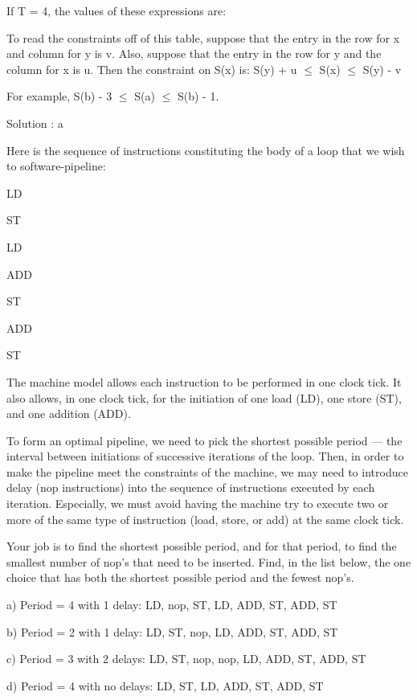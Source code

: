 \begin{problem}
{\color{red}If T = 4, the values of these expressions are:

To read the constraints off of this table, suppose that the entry in the row for x and column for y is v. Also, suppose that the entry in the row for y and the column for x is u. Then the constraint on S(x) is:
S(y) + u $\leq$ S(x) $\leq$ S(y) - v

For example, S(b) - 3 $\leq$ S(a) $\leq$ S(b) - 1.


Solution : a
}



\end{problem}



\begin{problem}
Here is the sequence of instructions constituting the body of a loop that we wish to software-pipeline:

\item LD
\item ST
\item LD
\item ADD
\item ST
\item ADD
\item ST

The machine model allows each instruction to be performed in one clock tick. It also allows, in one clock tick, for the initiation of one load (LD), one store (ST), and one addition (ADD).

To form an optimal pipeline, we need to pick the shortest possible period --- the interval between initiations of successive iterations of the loop. Then, in order to make the pipeline meet the constraints of the machine, we may need to introduce delay (nop instructions) into the sequence of instructions executed by each iteration. Especially, we must avoid having the machine try to execute two or more of the same type of instruction (load, store, or add) at the same clock tick.

Your job is to find the shortest possible period, and for that period, to find the smallest number of nop's that need to be inserted. Find, in the list below, the one choice that has both the shortest possible period and the fewest nop's.

 
\item   a) 	Period = 4 with 1 delay: LD, nop, ST, LD, ADD, ST, ADD, ST
\item  	b) 	Period = 2 with 1 delay: LD, ST, nop, LD, ADD, ST, ADD, ST
\item  	c) 	Period = 3 with 2 delays: LD, ST, nop, nop, LD, ADD, ST, ADD, ST
\item  	d) 	Period = 4 with no delays: LD, ST, LD, ADD, ST, ADD, ST



\end{problem}
